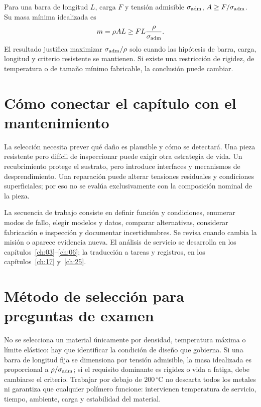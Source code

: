 Para una barra de longitud $L$, carga $F$ y tensión admisible $\sigma_{\rm adm}$, $A\geq F/\sigma_{\rm adm}$. Su masa mínima idealizada es
\begin{equation}m=\rho A L\geq FL\frac{\rho}{\sigma_{\rm adm}}.\label{eq:seleccionbarra}\end{equation}
El resultado justifica maximizar $\sigma_{\rm adm}/\rho$ solo cuando las hipótesis de barra, carga, longitud y criterio resistente se mantienen. Si existe una restricción de rigidez, de temperatura o de tamaño mínimo fabricable, la conclusión puede cambiar.
\section{Cómo conectar el capítulo con el mantenimiento}
La selección necesita prever qué daño es plausible y cómo se detectará. Una pieza resistente pero difícil de inspeccionar puede exigir otra estrategia de vida. Un recubrimiento protege el sustrato, pero introduce interfaces y mecanismos de desprendimiento. Una reparación puede alterar tensiones residuales y condiciones superficiales; por eso no se evalúa exclusivamente con la composición nominal de la pieza.

La secuencia de trabajo consiste en definir función y condiciones, enumerar modos de fallo, elegir modelos y datos, comparar alternativas, considerar fabricación e inspección y documentar incertidumbres. Se revisa cuando cambia la misión o aparece evidencia nueva. El análisis de servicio se desarrolla en los capítulos~\ref{ch:03}--\ref{ch:06}; la traducción a tareas y registros, en los capítulos~\ref{ch:17} y~\ref{ch:25}.
\section{Método de selección para preguntas de examen}
No se selecciona un material únicamente por densidad, temperatura máxima o límite elástico: hay que identificar la condición de diseño que gobierna. Si una barra de longitud fija se dimensiona por tensión admisible, la masa idealizada es proporcional a $\rho/\sigma_{\rm adm}$; si el requisito dominante es rigidez o vida a fatiga, debe cambiarse el criterio. Trabajar por debajo de $200\,^{\circ}\mathrm C$ no descarta todos los metales ni garantiza que cualquier polímero funcione: intervienen temperatura de servicio, tiempo, ambiente, carga y estabilidad del material.

